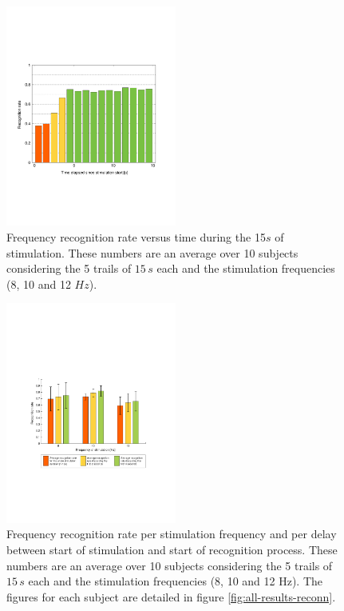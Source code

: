 \documentclass{svmult}
\begin{document}
\begin{figure}
\center
\includegraphics[width=0.5\textwidth]{figures/all_time_reconn.pdf}
\caption{Frequency recognition rate versus time during the 15$s$ of stimulation. These numbers are an average over 10 subjects considering the 5 trails of $15\,s$ each and the stimulation frequencies (8, 10 and 12 $Hz$).} \label{fig:all_time_reconn}
\end{figure}

\begin{figure}
\center
\includegraphics[width=0.5\textwidth]{figures/taux-reconn.pdf}
\caption{Frequency recognition rate per stimulation frequency and per delay between start of stimulation and start of recognition process. These numbers are an average over 10 subjects considering the 5 trails of $15\,s$ each and the stimulation frequencies (8, 10 and 12 Hz). The figures for each subject are detailed in figure \ref{fig:all-results-reconn}.}
\label{fig:taux-reconn}
\end{figure}
\end{document}
